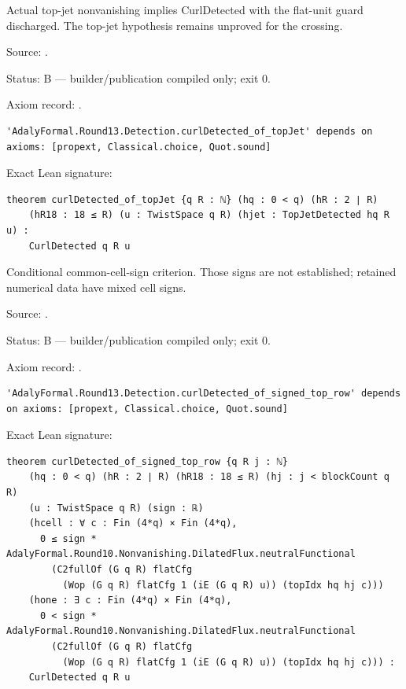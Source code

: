 \begin{theorem}[bp-504]
\label{bp-504}
\leanok
Actual top-jet nonvanishing implies CurlDetected with the flat-unit guard discharged. The top-jet hypothesis remains unproved for the crossing.

\par Source: \texttt{}.
\par Status: B — builder/publication compiled only; exit 0.
\par Axiom record: \texttt{}.
\begin{verbatim}
'AdalyFormal.Round13.Detection.curlDetected_of_topJet' depends on axioms: [propext, Classical.choice, Quot.sound]
\end{verbatim}
\par Exact Lean signature:
\begin{verbatim}
theorem curlDetected_of_topJet {q R : ℕ} (hq : 0 < q) (hR : 2 ∣ R)
    (hR18 : 18 ≤ R) (u : TwistSpace q R) (hjet : TopJetDetected hq R u) :
    CurlDetected q R u
\end{verbatim}
\end{theorem}

\begin{theorem}[bp-505]
\label{bp-505}
\leanok
Conditional common-cell-sign criterion. Those signs are not established; retained numerical data have mixed cell signs.

\par Source: \texttt{}.
\par Status: B — builder/publication compiled only; exit 0.
\par Axiom record: \texttt{}.
\begin{verbatim}
'AdalyFormal.Round13.Detection.curlDetected_of_signed_top_row' depends on axioms: [propext, Classical.choice, Quot.sound]
\end{verbatim}
\par Exact Lean signature:
\begin{verbatim}
theorem curlDetected_of_signed_top_row {q R j : ℕ}
    (hq : 0 < q) (hR : 2 ∣ R) (hR18 : 18 ≤ R) (hj : j < blockCount q R)
    (u : TwistSpace q R) (sign : ℝ)
    (hcell : ∀ c : Fin (4*q) × Fin (4*q),
      0 ≤ sign * AdalyFormal.Round10.Nonvanishing.DilatedFlux.neutralFunctional
        (C2fullOf (G q R) flatCfg
          (Wop (G q R) flatCfg 1 (iE (G q R) u)) (topIdx hq hj c)))
    (hone : ∃ c : Fin (4*q) × Fin (4*q),
      0 < sign * AdalyFormal.Round10.Nonvanishing.DilatedFlux.neutralFunctional
        (C2fullOf (G q R) flatCfg
          (Wop (G q R) flatCfg 1 (iE (G q R) u)) (topIdx hq hj c))) :
    CurlDetected q R u
\end{verbatim}
\end{theorem}

